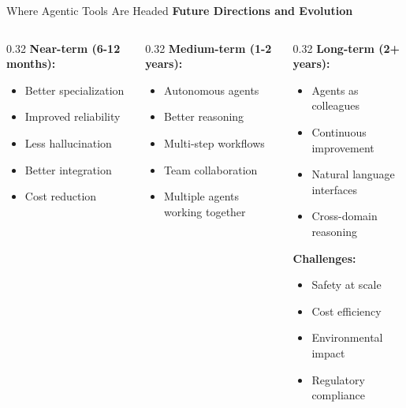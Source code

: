 \documentclass[aspectratio=169,11pt]{beamer}
\begin{document}
\begin{frame}{Where Agentic Tools Are Headed}
    \textbf{Future Directions and Evolution}

    \begin{columns}[T]
        \begin{column}{0.32\textwidth}
            \textbf{Near-term (6-12 months):}
            \begin{itemize}
                \item Better specialization
                \item Improved reliability
                \item Less hallucination
                \item Better integration
                \item Cost reduction
            \end{itemize}
        \end{column}
        \begin{column}{0.32\textwidth}
            \textbf{Medium-term (1-2 years):}
            \begin{itemize}
                \item Autonomous agents
                \item Better reasoning
                \item Multi-step workflows
                \item Team collaboration
                \item Multiple agents working together
            \end{itemize}
        \end{column}
        \begin{column}{0.32\textwidth}
            \textbf{Long-term (2+ years):}
            \begin{itemize}
                \item Agents as colleagues
                \item Continuous improvement
                \item Natural language interfaces
                \item Cross-domain reasoning
            \end{itemize}

            \vspace{0.3cm}
            \textbf{Challenges:}
            \begin{itemize}
                \item Safety at scale
                \item Cost efficiency
                \item Environmental impact
                \item Regulatory compliance
            \end{itemize}
        \end{column}
    \end{columns}


\end{frame}
\end{document}
